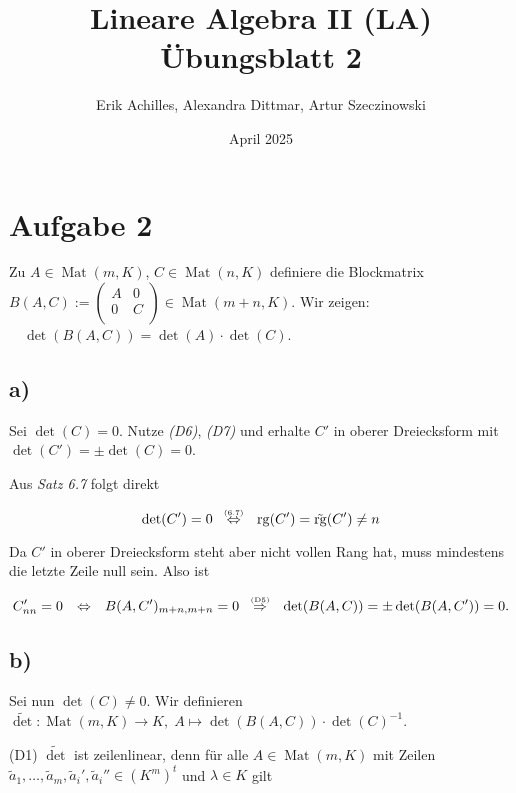 \documentclass{article}
\title{Lineare Algebra II (LA) Übungsblatt 2}
\author{Erik Achilles, Alexandra Dittmar, Artur Szeczinowski}
\date{April 2025}
\newcommand{\imp}{\mathbb{\Rightarrow}}
\newcommand{\equ}{\mathbb{\Leftrightarrow}}
\DeclareMathOperator{\Mat}{Mat}
\DeclareMathOperator{\rg}{rg}
\newcommand{\movs}[2]{\overset{\text{\tiny $#1$}}{\quad #2 \quad}}
\newcommand{\tovs}[2]{\overset{\text{\tiny (#1)}}{\quad #2 \quad}}
\begin{document}
\section*{Aufgabe 2}

Zu
$A \in \Mat(m, K)$,
$C \in \Mat(n, K)$
definiere die Blockmatrix
$
  B(A, C) :=
  \begin{pmatrix*}
    A & 0 \\
    0 & C \\
  \end{pmatrix*}
  \in \Mat(m + n, K).
$
Wir zeigen:
$ \quad \det(B(A, C)) = \det(A) \cdot \det(C)$.


\subsection*{a)}
Sei
$\det(C) = 0$.
Nutze
\textit{(D6)}, \textit{(D7)}
und erhalte
$C'$
in oberer Dreiecksform mit
$\det(C')= \pm \det(C)= 0$.

Aus
\textit{Satz 6.7}
folgt direkt

\[
  \det(C') = 0
  \tovs{6.7}{\equ}
  \rg(C') = \tilde{\rg}(C') \neq n
\]

Da
$C'$
in oberer Dreiecksform steht
aber nicht vollen Rang hat,
muss mindestens die letzte Zeile null sein.
Also ist

\[
  C'_{nn} = 0
  \movs{}{\equ}
  B(A, C')_{m+n,m+n} = 0
  \tovs{D5}{\imp}
  \det(B(A, C)) = \pm \det(B(A, C')) = 0.
\]


\subsection*{b)}
Sei nun
$\det(C) \neq 0$.
Wir definieren
$\widetilde{\det} : \Mat(m, K) \to K, \; A \mapsto \det(B(A, C)) \cdot \det(C)^{-1}$.

\bigbreak
(D1) $\widetilde{\det}$ ist zeilenlinear, denn für alle
$A \in \Mat(m, K)$
mit Zeilen
$\tilde{a}_1, \dots, \tilde{a}_m, \tilde{a}_i', \tilde{a}_i'' \in (K^m)^t$
und
$\lambda \in K$
gilt
\end{document}
